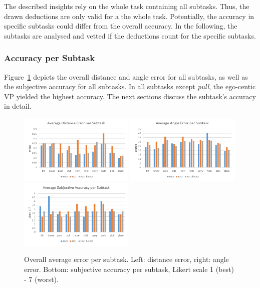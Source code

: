 The described insights rely on the whole task containing all subtasks. Thus, the drawn deductions are only valid for a the whole task. Potentially, the accuracy in specific subtasks could differ from the overall accuracy. In the following, the subtasks are analysed and vetted if the deductions count for the specific subtasks.

\subsubsection{Accuracy per Subtask}
\label{sec:evalAccSubtask}
Figure~\ref{fig:avgErrorPerSubTask} depicts the overall distance and angle error for all subtasks, as well as the subjective accuracy for all subtasks. In all subtasks except \textit{pull}, the ego-centic VP yielded the highest accuracy. The next sections discuss the subtask's accuracy in detail.
\begin{figure}[H]
	\centering
	\includegraphics[width=0.49\textwidth]{figures/averageDistanceErrorPerSubTask.png}
	\includegraphics[width=0.49\textwidth]{figures/averageAngleErrorPerSubTask.png}
	\includegraphics[width=0.49\textwidth]{figures/subjectiveAccuracyBySubTask.png}
	\caption[Overall accuracy per subtask]{Overall average error per subtask. Left: distance error, right: angle error. Bottom: subjective accuracy per subtask, Likert scale 1 (best) - 7 (worst).}
	\label{fig:avgErrorPerSubTask}
\end{figure}


